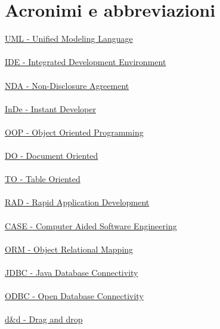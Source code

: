 \chapter{Acronimi e abbreviazioni}

\noindent \hyperref[UMLl]{UML - Unified Modeling Language}
\\
\\
\noindent \hyperref[IDE]{IDE - Integrated Development Environment}
\\
\\
\noindent \hyperref[NDA]{NDA - Non-Disclosure Agreement}
\\
\\
\noindent \hyperref[InDe]{InDe - Instant Developer}
\\
\\
\noindent \hyperref[OOP]{OOP - Object Oriented Programming}
\\
\\
\noindent \hyperref[DO]{DO - Document Oriented}
\\
\\
\noindent \hyperref[TO]{TO - Table Oriented}
\\
\\
\noindent \hyperref[RAD]{RAD - Rapid Application Development}
\\
\\
\noindent \hyperref[CASE]{CASE - Computer Aided Software Engineering}
\\
\\
\noindent \hyperref[ORM]{ORM - Object Relational Mapping}
\\
\\
\noindent \hyperref[JDBC]{JDBC - Java Database Connectivity}
\\
\\
\noindent \hyperref[ODBC]{ODBC - Open Database Connectivity}
\\
\\
\noindent \hyperref[draganddrop]{d\&d - Drag and drop}
\\
\\
